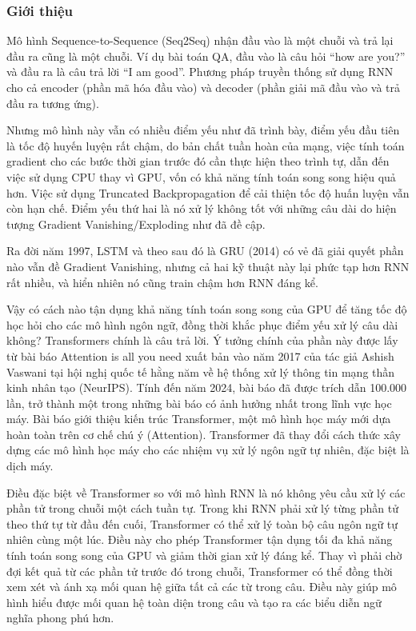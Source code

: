 \subsubsection{Giới thiệu}
Mô hình Sequence-to-Sequence (Seq2Seq) nhận đầu vào là một chuỗi và trả lại đầu ra cũng là một chuỗi. Ví dụ bài toán QA, đầu vào là câu hỏi ``how are you?'' và đầu ra là câu trả lời ``I am good''. Phương pháp truyền thống sử dụng RNN cho cả encoder (phần mã hóa đầu vào) và decoder (phần giải mã đầu vào và trả đầu ra tương ứng)\cite{webpage22}.

Nhưng mô hình này vẫn có nhiều điểm yếu như đã trình bày, điểm yếu đầu tiên là tốc độ huyến luyện rất chậm, do bản chất tuần hoàn của mạng, việc tính toán gradient cho các bước thời gian trước đó cần thực hiện theo trình tự, dẫn đến việc sử dụng CPU thay vì GPU, vốn có khả năng tính toán song song hiệu quả hơn. Việc sử dụng Truncated Backpropagation để cải thiện tốc độ huấn luyện vẫn còn hạn chế. Điểm yếu thứ hai là nó xử lý không tốt với những câu dài do hiện tượng Gradient Vanishing/Exploding như đã đề cập.

Ra đời năm 1997, LSTM và theo sau đó là GRU (2014) có vẻ đã giải quyết phần nào vẫn đề Gradient Vanishing, nhưng cả hai kỹ thuật này lại phức tạp hơn RNN rất nhiều, và hiển nhiên nó cũng train chậm hơn RNN đáng kể.

Vậy có cách nào tận dụng khả năng tính toán song song của GPU để tăng tốc độ học hỏi cho các mô hình ngôn ngữ, đồng thời khắc phục điểm yếu xử lý câu dài không? Transformers chính là câu trả lời. Ý tưởng chính của phần này được lấy từ bài báo Attention is all you need\cite{vaswani2023attentionneed} xuất bản vào năm 2017 của tác giả Ashish Vaswani tại hội nghị quốc tế hằng năm về hệ thống xử lý thông tin mạng thần kinh nhân tạo (NeurIPS). Tính đến năm 2024, bài báo đã được trích dẫn 100.000 lần, trở thành một trong những bài báo có ảnh hưởng nhất trong lĩnh vực học máy. Bài báo giới thiệu kiến trúc Transformer, một mô hình học máy mới dựa hoàn toàn trên cơ chế chú ý (Attention). Transformer đã thay đổi cách thức xây dựng các mô hình học máy cho các nhiệm vụ xử lý ngôn ngữ tự nhiên, đặc biệt là dịch máy.

Điều đặc biệt về Transformer so với mô hình RNN là nó không yêu cầu xử lý các phần tử trong chuỗi một cách tuần tự. Trong khi RNN phải xử lý từng phần tử theo thứ tự từ đầu đến cuối, Transformer có thể xử lý toàn bộ câu ngôn ngữ tự nhiên cùng một lúc. Điều này cho phép Transformer tận dụng tối đa khả năng tính toán song song của GPU và giảm thời gian xử lý đáng kể. Thay vì phải chờ đợi kết quả từ các phần tử trước đó trong chuỗi, Transformer có thể đồng thời xem xét và ánh xạ mối quan hệ giữa tất cả các từ trong câu. Điều này giúp mô hình hiểu được mối quan hệ toàn diện trong câu và tạo ra các biểu diễn ngữ nghĩa phong phú hơn.

